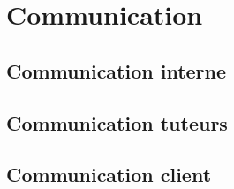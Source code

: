 \documentclass[asi]{picInsa}
\begin{document}
\section{Communication}
\subsection{Communication interne}

\subsection{Communication tuteurs}

\subsection{Communication client}





\begin{appendix}
\listoffigures
{}
	 
\listoftables
{}
\end{appendix}
\pageQuatriemeCouverture
\end{document}
